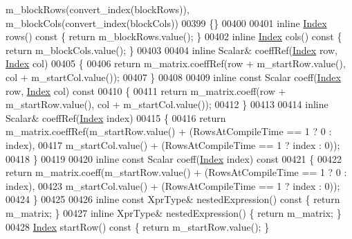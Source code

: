 \begin{DoxyCode}
      m\_blockRows(convert\_index(blockRows)), m\_blockCols(convert\_index(blockCols))
00399     \{\}
00400 
00401     \textcolor{keyword}{inline} \hyperlink{group___core___module_a554f30542cc2316add4b1ea0a492ff02}{Index} rows()\textcolor{keyword}{ const }\{ \textcolor{keywordflow}{return} m\_blockRows.value(); \}
00402     \textcolor{keyword}{inline} \hyperlink{group___core___module_a554f30542cc2316add4b1ea0a492ff02}{Index} cols()\textcolor{keyword}{ const }\{ \textcolor{keywordflow}{return} m\_blockCols.value(); \}
00403 
00404     \textcolor{keyword}{inline} Scalar& coeffRef(\hyperlink{group___core___module_a554f30542cc2316add4b1ea0a492ff02}{Index} row, \hyperlink{group___core___module_a554f30542cc2316add4b1ea0a492ff02}{Index} col)
00405     \{
00406       \textcolor{keywordflow}{return} m\_matrix.coeffRef(row + m\_startRow.value(), col + m\_startCol.value());
00407     \}
00408 
00409     \textcolor{keyword}{inline} \textcolor{keyword}{const} Scalar coeff(\hyperlink{group___core___module_a554f30542cc2316add4b1ea0a492ff02}{Index} row, \hyperlink{group___core___module_a554f30542cc2316add4b1ea0a492ff02}{Index} col)\textcolor{keyword}{ const}
00410 \textcolor{keyword}{    }\{
00411       \textcolor{keywordflow}{return} m\_matrix.coeff(row + m\_startRow.value(), col + m\_startCol.value());
00412     \}
00413 
00414     \textcolor{keyword}{inline} Scalar& coeffRef(\hyperlink{group___core___module_a554f30542cc2316add4b1ea0a492ff02}{Index} index)
00415     \{
00416       \textcolor{keywordflow}{return} m\_matrix.coeffRef(m\_startRow.value() + (RowsAtCompileTime == 1 ? 0 : index),
00417                                m\_startCol.value() + (RowsAtCompileTime == 1 ? index : 0));
00418     \}
00419 
00420     \textcolor{keyword}{inline} \textcolor{keyword}{const} Scalar coeff(\hyperlink{group___core___module_a554f30542cc2316add4b1ea0a492ff02}{Index} index)\textcolor{keyword}{ const}
00421 \textcolor{keyword}{    }\{
00422       \textcolor{keywordflow}{return} m\_matrix.coeff(m\_startRow.value() + (RowsAtCompileTime == 1 ? 0 : index),
00423                             m\_startCol.value() + (RowsAtCompileTime == 1 ? index : 0));
00424     \}
00425 
00426     \textcolor{keyword}{inline} \textcolor{keyword}{const} XprType& nestedExpression()\textcolor{keyword}{ const }\{ \textcolor{keywordflow}{return} m\_matrix; \}
00427     \textcolor{keyword}{inline} XprType& nestedExpression() \{ \textcolor{keywordflow}{return} m\_matrix; \}
00428     \hyperlink{group___core___module_a554f30542cc2316add4b1ea0a492ff02}{Index} startRow()\textcolor{keyword}{ const }\{ \textcolor{keywordflow}{return} m\_startRow.value(); \}

\end{DoxyCode}
